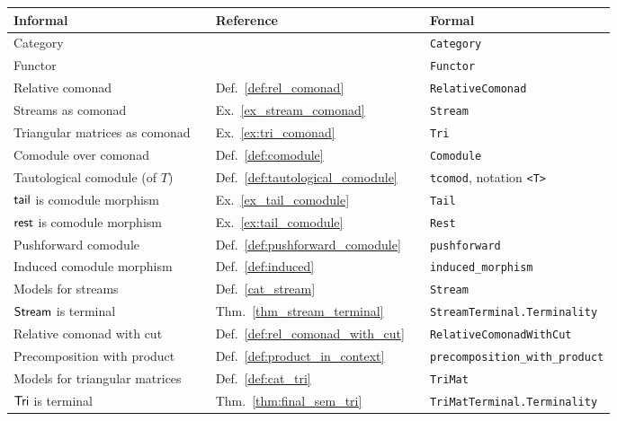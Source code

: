 

{


\begin{center}
{\renewcommand{\arraystretch}{1.2}
\begin{tabular}{lllll}
Informal && Reference && Formal \\ \hline
Category &&  && \lstinline!Category!\\
Functor &&  && \lstinline!Functor!\\
Relative comonad && Def.\ \ref{def:rel_comonad} && \lstinline!RelativeComonad!\\
Streams as comonad && Ex.\ \ref{ex_stream_comonad} && \lstinline!Stream!\\
Triangular matrices as comonad && Ex.\ \ref{ex:tri_comonad} && \lstinline!Tri!\\
Comodule over comonad && Def.\ \ref{def:comodule} && \lstinline!Comodule!\\
Tautological comodule (of $T$) && Def.\ \ref{def:tautological_comodule} &&\lstinline!tcomod!, notation \lstinline!<T>!\\
$\mathsf{tail}$ is comodule morphism && Ex.\ \ref{ex_tail_comodule}&& \lstinline!Tail!\\
$\mathsf{rest}$ is comodule morphism && Ex.\ \ref{ex:tail_comodule} && \lstinline!Rest!\\
Pushforward comodule && Def.\ \ref{def:pushforward_comodule} && \lstinline!pushforward!\\
Induced comodule morphism && Def.\ \ref{def:induced} && \lstinline!induced_morphism!\\
Models for streams    && Def.\ \ref{cat_stream} && \lstinline!Stream!\\
$\mathsf{Stream}$ is terminal && Thm.\ \ref{thm_stream_terminal} && \lstinline!StreamTerminal.Terminality!\\
Relative comonad with cut && Def.\ \ref{def:rel_comonad_with_cut} && \lstinline!RelativeComonadWithCut!\\
Precomposition with product && Def.\ \ref{def:product_in_context} &&\lstinline!precomposition_with_product!\\
Models for triangular matrices && Def.\ \ref{def:cat_tri} && \lstinline!TriMat!\\
$\mathsf{Tri}$ is terminal && Thm.\ \ref{thm:final_sem_tri} && \lstinline!TriMatTerminal.Terminality!\\
\end{tabular}
}
\end{center}


}
